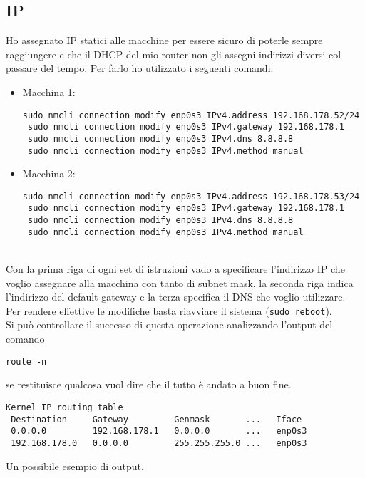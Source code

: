 \subsection{IP}

Ho assegnato IP statici alle macchine per essere sicuro di poterle sempre raggiungere e che il DHCP del mio router non gli assegni indirizzi diversi col passare del tempo. Per farlo ho utilizzato i seguenti comandi:

\begin{itemize}
	\item Macchina 1: 
	\begin{lstlisting}[style=cmd]
 sudo nmcli connection modify enp0s3 IPv4.address 192.168.178.52/24
 sudo nmcli connection modify enp0s3 IPv4.gateway 192.168.178.1
 sudo nmcli connection modify enp0s3 IPv4.dns 8.8.8.8
 sudo nmcli connection modify enp0s3 IPv4.method manual
	\end{lstlisting}
	\item Macchina 2:
		\begin{lstlisting}[style=cmd]
 sudo nmcli connection modify enp0s3 IPv4.address 192.168.178.53/24
 sudo nmcli connection modify enp0s3 IPv4.gateway 192.168.178.1
 sudo nmcli connection modify enp0s3 IPv4.dns 8.8.8.8
 sudo nmcli connection modify enp0s3 IPv4.method manual
	\end{lstlisting}
\end{itemize}
\ \\
Con la prima riga di ogni set di istruzioni vado a specificare l'indirizzo IP che voglio assegnare alla macchina con tanto di subnet mask, la seconda riga indica l'indirizzo del default gateway e la terza specifica il DNS che voglio utilizzare.
\ \\
Per rendere effettive le modifiche basta riavviare il sistema (\lstinline[style=cmd]|sudo reboot|).\\
Si pu\`{o} controllare il successo di questa operazione analizzando l'output del comando
\begin{lstlisting}[style=cmd]
 route -n
\end{lstlisting}
se restituisce qualcosa vuol dire che il tutto \`{e} andato a buon fine.\\

\begin{lstlisting}[style=output]
 Kernel IP routing table
 Destination     Gateway         Genmask       ...   Iface
 0.0.0.0         192.168.178.1   0.0.0.0       ...   enp0s3
 192.168.178.0   0.0.0.0         255.255.255.0 ...   enp0s3
\end{lstlisting}
Un possibile esempio di output.
